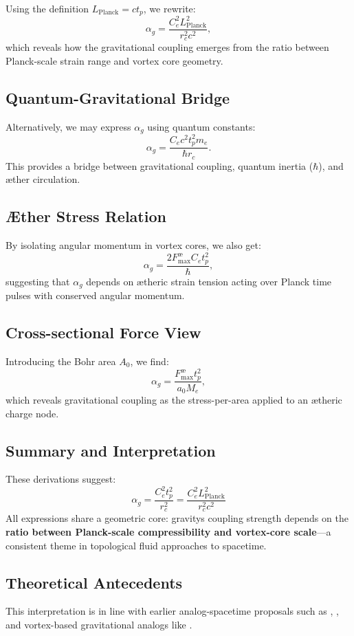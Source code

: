 Using the definition $L_{\text{Planck}} = c t_p$, we rewrite:
\[
    \alpha_g = \frac{C_e^2 L_{\text{Planck}}^2}{r_c^2 c^2},
\]
which reveals how the gravitational coupling emerges from the ratio between Planck-scale strain range and vortex core geometry.

\subsection*{Quantum-Gravitational Bridge}

Alternatively, we may express $\alpha_g$ using quantum constants:
\[
    \alpha_g = \frac{C_e c^2 t_p^2 m_e}{\hbar r_c}.
\]
This provides a bridge between gravitational coupling, quantum inertia ($\hbar$), and æther circulation.

\subsection*{Æther Stress Relation}

By isolating angular momentum in vortex cores, we also get:
\[
    \alpha_g = \frac{2 F^{\text{\ae}}_{\text{max}} C_e t_p^2}{\hbar},
\]
suggesting that $\alpha_g$ depends on ætheric strain tension acting over Planck time pulses with conserved angular momentum.

\subsection*{Cross-sectional Force View}

Introducing the Bohr area $A_0$, we find:
\[
    \alpha_g = \frac{F^{\text{\ae}}_{\text{max}} t_p^2}{a_0 M_e},
\]
which reveals gravitational coupling as the stress-per-area applied to an ætheric charge node.

\subsection*{Summary and Interpretation}

These derivations suggest:
\[
    \boxed{
        \alpha_g = \frac{C_e^2 t_p^2}{r_c^2} = \frac{C_e^2 L_{\text{Planck}}^2}{r_c^2 c^2}
    }
\]
All expressions share a geometric core: gravity\rqs s coupling strength depends on the \textbf{ratio between Planck-scale compressibility and vortex-core scale}—a consistent theme in topological fluid approaches to spacetime.

\subsection*{Theoretical Antecedents}

This interpretation is in line with earlier analog-spacetime proposals such as \cite{barcelo2011}, \cite{volovik2003universe}, and vortex-based gravitational analogs like \cite{ranada1989topological}.
